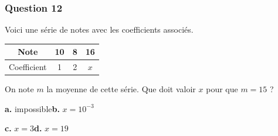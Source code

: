 \documentclass[10pt]{article}
\begin{document}
\subsubsection*{Question 12}
Voici une série de notes avec les coefficients associés.

\begin{center}
\begin{tabular}{|c|c|c|c|}
\hline
Note & 10 & 8 & 16 \\
\hline
Coefficient & 1 & 2 & $x$ \\
\hline
\end{tabular}
\end{center}

On note $m$ la moyenne de cette série. Que doit valoir $x$ pour que $m = 15$ ?

\textbf{a.} impossible\hfill \textbf{b.} $x = 10^{-3}$

\textbf{c.} $x = 3$\hfill \textbf{d.} $x = 19$
\end{document}
